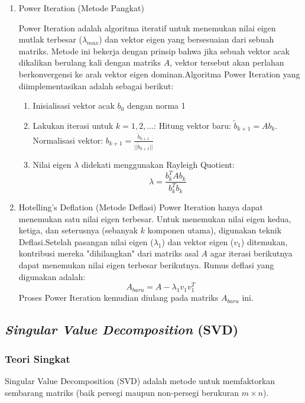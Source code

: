 \documentclass[12pt,a4paper]{article}
\begin{document}
\begin{enumerate}
    \item Power Iteration (Metode Pangkat) {
    \newline Power Iteration adalah algoritma iteratif untuk menemukan nilai eigen mutlak terbesar ($\lambda_{max}$) dan vektor eigen yang bersesuaian dari sebuah matriks. Metode ini bekerja dengan prinsip bahwa jika sebuah vektor acak dikalikan berulang kali dengan matriks $A$, vektor tersebut akan perlahan berkonvergensi ke arah vektor eigen dominan.Algoritma Power Iteration yang diimplementasikan adalah sebagai berikut:
    \begin{enumerate}
        \item Inisialisasi vektor acak $b_0$ dengan norma 1
        \item Lakukan iterasi untuk $k = 1, 2, \dots$: {
            Hitung vektor baru: $\tilde{b}_{k+1} = A b_k$. Normalisasi vektor: $b_{k+1} = \frac{\tilde{b}_{k+1}}{||\tilde{b}_{k+1}||}$
        }
        \item Nilai eigen $\lambda$ didekati menggunakan Rayleigh Quotient:$$\lambda = \frac{b_k^T A b_k}{b_k^T b_k}$$ 
    \end{enumerate}
    }

    \item Hotelling's Deflation (Metode Deflasi) {\newline Power Iteration hanya dapat menemukan satu nilai eigen terbesar. Untuk menemukan nilai eigen kedua, ketiga, dan seterusnya (sebanyak $k$ komponen utama), digunakan teknik Deflasi.Setelah pasangan nilai eigen ($\lambda_1$) dan vektor eigen ($v_1$) ditemukan, kontribusi mereka "dihilangkan" dari matriks asal $A$ agar iterasi berikutnya dapat menemukan nilai eigen terbesar berikutnya. Rumus deflasi yang digunakan adalah:$$A_{baru} = A - \lambda_1 v_1 v_1^T$$ Proses Power Iteration kemudian diulang pada matriks $A_{baru}$ ini.
    }
\end{enumerate}

\subsection{\textit{Singular Value Decomposition }(SVD)}
\subsubsection{Teori Singkat}
Singular Value Decomposition (SVD) adalah metode untuk memfaktorkan sembarang matriks (baik persegi maupun non-persegi berukuran $m \times n$).\\
\end{document}
